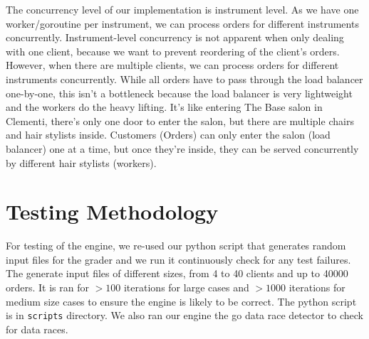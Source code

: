 \documentclass[11pt]{article}
\begin{document}
The concurrency level of our implementation is instrument level. As we have one worker/goroutine per instrument, we can process orders for different instruments concurrently. Instrument-level concurrency is not apparent when only dealing with one client, because we want to prevent reordering of the client's orders. However, when there are multiple clients, we can process orders for different instruments concurrently.
While all orders have to pass through the load balancer one-by-one, this isn't a bottleneck because the load balancer is very lightweight and the workers do the heavy lifting. It's like entering The Base salon in Clementi, there's only one door to enter the salon, but there are multiple chairs and hair stylists inside. Customers (Orders) can only enter the salon (load balancer) one at a time, but once they're inside, they can be served concurrently by different hair stylists (workers).


\section{Testing Methodology}

For testing of the engine, we re-used our python script that generates random input files for the grader and we run it
continuously check for any test failures. The generate input files of different sizes, from 4 to 40
clients and up to 40000 orders. It is ran for $> 100$ iterations for large cases and $> 1000$
iterations for medium size cases to ensure the engine is likely to be correct.
The python script is in \texttt{scripts} directory. We
also ran our engine the go data race detector to check for data races.

\end{document}
